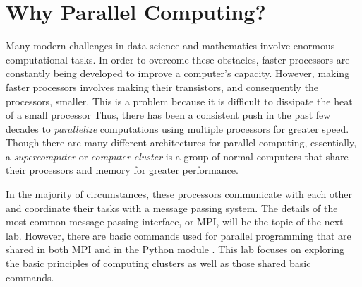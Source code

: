 \label{lab:parallel1}

\section*{Why Parallel Computing?}
Many modern challenges in data science and mathematics involve enormous computational tasks.
In order to overcome these obstacles, faster processors are constantly being developed to improve a computer's capacity.
However, making faster processors involves making their transistors, and consequently the processors, smaller. 
This is a problem because it is difficult to dissipate the heat of a small processor
Thus, there has been a consistent push in the past few decades to \emph{parallelize} computations using multiple processors for greater speed.
Though there are many different architectures for parallel computing, essentially, a \emph{supercomputer} or \emph{computer cluster} is a group of normal computers that share their processors and memory for greater performance.

In the majority of circumstances, these processors communicate with each other and coordinate their tasks with a message passing system. 
The details of the most common message passing interface, or MPI, will be the topic of the next lab.
However, there are basic commands used for parallel programming that are shared in both MPI and in the Python module . 
This lab focuses on exploring the basic principles of computing clusters as well as those shared basic commands.

